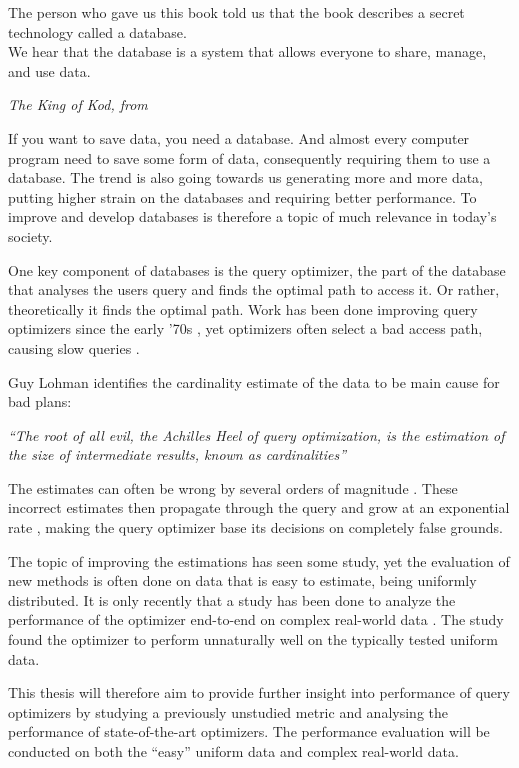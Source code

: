 \epigraph{The person who gave us this book told us that the book describes a secret technology called a database.\\
We hear that the database is a system that allows everyone to share, manage, and use data.}{\textit{The King of Kod, from \cite[p. 6]{takahashi_2009_manga_tmgtd}}}

If you want to save data, you need a database. And almost every computer program need to save some form of data, consequently requiring them to use a database. The trend is also going towards us generating more and more data, putting higher strain on the databases and requiring better performance. To improve and develop databases is therefore a topic of much relevance in today's society.

One key component of databases is the query optimizer, the part of the database that analyses the users query and finds the optimal path to access it. Or rather, theoretically it finds the optimal path. Work has been done improving query optimizers since the early '70s \cite{chaudhuri_1998_overview_aooqoirs}, yet optimizers often select a bad access path, causing slow queries \cite{leis_2015_how_hgaqor}.

Guy Lohman identifies the cardinality estimate of the data to be main cause for bad plans:

\textit{``The root of all evil, the Achilles Heel of query optimization, is the estimation of the size of intermediate results, known as cardinalities''}

The estimates can often be wrong by several orders of magnitude \cite{lohman_query_iqoap}. These incorrect estimates then propagate through the query and grow at an exponential rate \cite{ioannidis_1991_propagation_otpoeitsojr}, making the query optimizer base its decisions on completely false grounds.

The topic of improving the estimations has seen some study, yet the evaluation of new methods is often done on data that is easy to estimate, being uniformly distributed. It is only recently that a study has been done to analyze the performance of the optimizer end-to-end on complex real-world data \cite{leis_2015_how_hgaqor}. The study found the optimizer to perform unnaturally well on the typically tested uniform data.

This thesis will therefore aim to provide further insight into performance of query optimizers by studying a previously unstudied metric and analysing the performance of state-of-the-art optimizers. The performance evaluation will be conducted on both the ``easy'' uniform data and complex real-world data.

